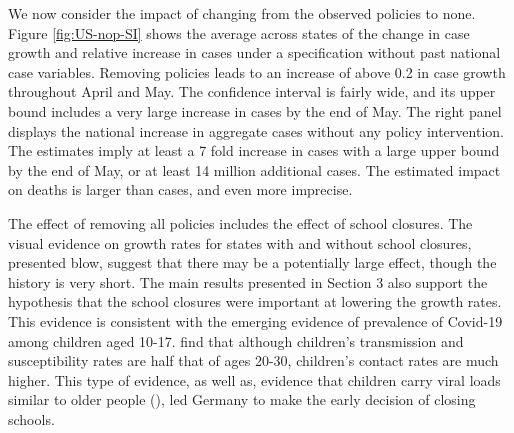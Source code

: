 \documentclass[11pt,reqno,letter]{amsart}
\theoremstyle{definition}
\begin{document}
We now consider the impact of changing from the observed policies to none.
Figure \ref{fig:US-nop-SI} shows the average across states of the change
in case growth and relative increase in cases under a specification without past national case variables.
Removing policies leads to an increase of above 0.2 in
case growth throughout April and May. The confidence interval is
fairly wide, and its upper bound includes a very large increase in
cases by the end of May.  The right panel displays the national
increase in aggregate cases without any policy intervention. The
estimates imply at least a 7 fold increase in cases with a large upper bound by the end of May, or
at least 14 million additional cases. The estimated impact on deaths is larger than
cases, and even more imprecise.

The effect of removing all policies includes the effect of school
closures. The visual evidence on growth rates for states with and without school closures,
presented blow, suggest that there may be a potentially large effect, though the history is very short. The main results presented in Section 3 also support the hypothesis that the school closures were important at lowering the growth rates.  This evidence is consistent
with the emerging evidence of prevalence of Covid-19 among children
aged 10-17. \cite{children:nature} find that although children's
transmission and susceptibility rates are half that of ages 20-30,
children's contact rates are much higher.
This type of evidence, as well as, evidence that children carry viral
loads similar to older people (\cite{children:germany}), led Germany to make the early decision of closing schools.
\end{document}
